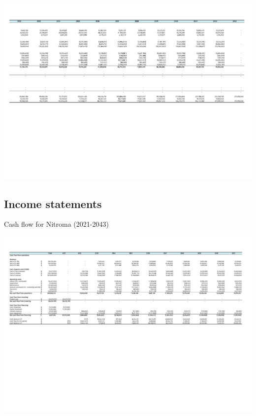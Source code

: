 \begin{landscape}
\begin{table}
\includegraphics[clip, trim=0cm 5cm 0cm 0cm, width=\linewidth]{chapters/Z-support/attachments/Cash2.pdf}
\end{table}

\subsection{Income statements}
\begin{table}
\label{tab:Income}
  \caption{Cash flow for Nitroma (2021-2043)}
\includegraphics[clip, trim=0cm 5cm 0cm 0cm, width=\linewidth]{chapters/Z-support/attachments/Cash1.pdf}
\end{table}


\end{landscape}
